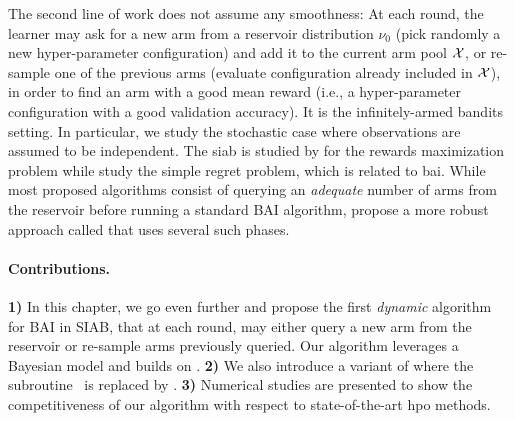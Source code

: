 The second line of work does not assume any smoothness: At each round, the learner may ask for a new arm from a \gls{reservoir} distribution $\nu_0$ (pick randomly a new hyper-parameter configuration) and add it to the current arm pool $\mathcal{X}$, or re-sample one of the previous arms (evaluate configuration already included in $\mathcal{X}$), in order to find an arm with a good mean reward (i.e., a hyper-parameter configuration with a good validation accuracy). It is the \gls{infinitely-armed bandits} setting. In particular, we study the stochastic case where observations are assumed to be independent. The \gls{siab} is studied by \citet{berry1997infinite,wang2008ucbv} for the rewards maximization problem while \citet{carpentier2015siri,aziz2018confidence} study the simple regret problem, which is related to \gls{bai}. While most proposed algorithms consist of querying an \emph{adequate} number of arms from the reservoir before running a standard BAI algorithm, \cite{li2017hyperband} propose a more robust approach called \Hyperband{} that uses several such phases.

\paragraph{Contributions.}
\textbf{1)}
In this chapter, we go even further and propose the first \emph{dynamic} algorithm for BAI in SIAB, that at each round, may either query a new arm from the reservoir or re-sample arms previously queried. Our algorithm leverages a Bayesian model and builds on \TTTS{}. 
\textbf{2)}
We also introduce a variant of \Hyperband{} where the \SHA subroutine~\citep{karnin2013sha} is replaced by \TTTS{}. 
\textbf{3)}
Numerical studies are presented to show the competitiveness of our algorithm with respect to state-of-the-art \gls{hpo} methods.
